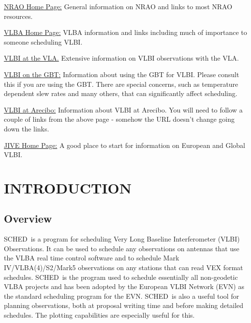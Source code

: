 \documentclass{report}
\newcommand{\schedb}{{\sc SCHED~}}
\begin{document}
\begin{list}{}{\parsep 0em  \itemsep 0em }

\item 
{\href{http://www.nrao.edu/}{NRAO Home Page:}}  General
information on NRAO and links to most NRAO resources.

\item 
{\href{https://science.nrao.edu/facilities/vlba}{VLBA Home Page:}}
VLBA information and links
including much of importance to someone scheduling VLBI.

\item 
{\href{https://science.nrao.edu/facilities/vla/docs/manuals/obsguide/modes/vlbi}
{VLBI at the VLA.}}
Extensive information on VLBI observations with the VLA.

\item 
{\href{http://www.gb.nrao.edu/~fghigo/gbtdoc/vlbinfo.html\#hifreq}{VLBI on the GBT:}}
Information about using the GBT for VLBI.  Please consult this
if you are using the GBT.  There are special concerns, such as temperature
dependent slew rates and many others, that can significantly affect
scheduling.

\item 
{\href{http://www.naic.edu/science/generalinfo_set.htm}{VLBI at Arecibo:}}
Information about VLBI at Arecibo.  You will need to follow a couple
of links from the above page - somehow the URL doesn't change going
down the links.


\item 
{\href{http://www.jive.nl/}{JIVE Home Page:}}  A good
place to start for information on European and Global VLBI.

\end{list}



\newpage

\chapter{\label{CHP:INTRO}INTRODUCTION}

\section{\label{SEC:INTRO}Overview}

\schedb is a program for scheduling Very Long Baseline Interferometer
(VLBI) Observations.  It can be used to schedule any observations on
antennas that use the VLBA real time control software and to schedule
Mark IV/VLBA(4)/S2/Mark5 observations on any stations that can read
VEX format schedules.  \schedb is the program used to schedule
essentially all non-geodetic VLBA projects and has been adopted by the
European VLBI Network (EVN) as the standard scheduling program for the
EVN.  \schedb is also a useful tool for planning observations, both at
proposal writing time and before making detailed schedules.  The
plotting capabilities are especially useful for this.
\end{document}
